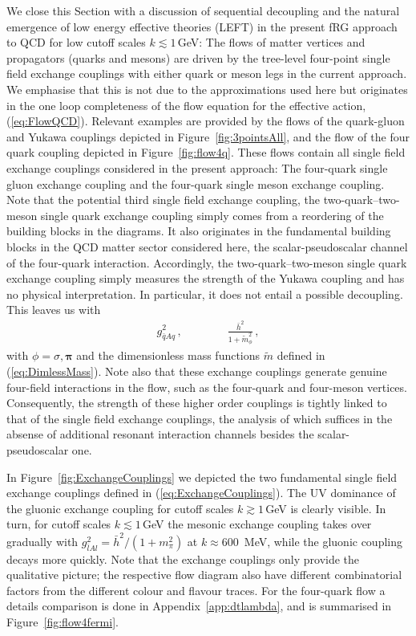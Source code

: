 \documentclass[%
reprint,
superscriptaddress,
showpacs,preprintnumbers,
 amsmath,amssymb,
 aps,
prd,
]{revtex4-1}
\def\eq#1{(\ref{#1})}
\def\fig#1{Figure~\ref{#1}}
\def\app#1{Appendix~\ref{#1}}
\begin{document}
We close this Section with a discussion of sequential decoupling and
the natural emergence of low energy effective theories (LEFT) in the
present fRG approach to QCD for low cutoff scales $k\lesssim 1$\,GeV:
The flows of matter vertices and propagators (quarks and mesons) are
driven by the tree-level four-point single field exchange couplings
with either quark or meson legs in the current approach.  We emphasise
that this is not due to the approximations used here but originates in
the one loop completeness of the flow equation for the effective
action, \eq{eq:FlowQCD}. Relevant examples are provided by the flows
of the quark-gluon and Yukawa couplings depicted in
\fig{fig:3pointsAll}, and the flow of the four quark coupling depicted
in \fig{fig:flow4q}. These flows contain all single field exchange
couplings considered in the present approach: The four-quark single
gluon exchange coupling and the four-quark single meson exchange
coupling.  Note that the potential third single field exchange
coupling, the two-quark--two-meson single quark exchange coupling
simply comes from a reordering of the building blocks in the
diagrams. It also originates in the fundamental building blocks in the
QCD matter sector considered here, the scalar-pseudoscalar channel of
the four-quark interaction. Accordingly, the two-quark--two-meson
single quark exchange coupling simply measures the strength of the
Yukawa coupling and has no physical interpretation. In particular, it
does not entail a possible decoupling.  This leaves us with
%
\begin{align}\label{eq:ExchangeCouplings}
  g^2_{\bar q A q}\,, \qquad \qquad \frac{\bar h^2 }{1
  +\tilde m_\phi^2}\,, 
\end{align}
%
with $\phi=\sigma,\bm \pi$ and the dimensionless mass functions
$\tilde m$ defined in \eq{eq:DimlessMass}. Note also that these
exchange couplings generate genuine four-field interactions in the
flow, such as the four-quark and four-meson vertices. Consequently,
the strength of these higher order couplings is tightly linked to that
of the single field exchange couplings, the analysis of which suffices
in the absense of additional resonant interaction channels besides the
scalar-pseudoscalar one.

In \fig{fig:ExchangeCouplings} we depicted the two fundamental single
field exchange couplings defined in \eq{eq:ExchangeCouplings}. The UV
dominance of the gluonic exchange coupling for cutoff scales
$k\gtrsim 1$\,GeV is clearly visible.  In turn, for cutoff scales
$k\lesssim 1$\,GeV the mesonic exchange coupling takes over gradually
with $g_{\bar l A l}^2 = \bar h^2/(1+m_\pi^2)$ at $k\approx 600$\,
MeV, while the gluonic coupling decays more quickly. Note that the
exchange couplings only provide the qualitative picture; the
respective flow diagram also have different combinatorial factors
from the different colour and flavour traces. For the four-quark flow
a details comparison is done in \app{app:dtlambda}, and is summarised
in \fig{fig:flow4fermi}.
  
\end{document}
